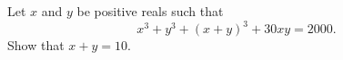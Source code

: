 Let $x$ and $y$ be positive reals such that \[ x^3 + y^3 + (x + y)^3 + 30xy = 2000. \] Show that $x + y = 10$.